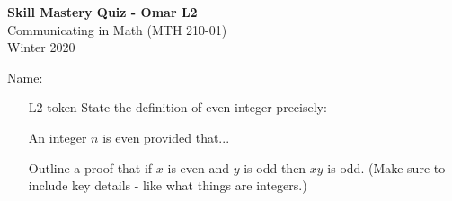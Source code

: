 \documentclass[10pt]{article}
\begin{document}
\vspace{-1.2in}
\begin{center} \textbf{\Large{Skill Mastery Quiz - Omar L2}} \\
Communicating in Math (MTH 210-01)\\
Winter 2020
\end{center}



\noindent Name: 




\begin{itemize}
	
\item[L2-token] State the definition of even integer precisely:

An integer $n$ is even provided that...



\vfill
Outline a proof that if $x$ is even and $y$ is odd then $xy$ is odd. (Make sure to include key details - like what things are integers.)
 

\vfill
\vfill
\vfill
\vfill
\end{itemize}
	
\end{document}
